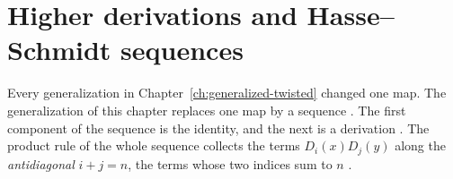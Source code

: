 \section{Higher derivations and Hasse--Schmidt sequences}\label{sec:higher-multi:hasse-schmidt}

Every generalization in Chapter~\ref{ch:generalized-twisted} changed one
map. The generalization of this chapter replaces one map by a sequence
\cite[p.~2323]{FerreroHaetinger2002}. The first component of the sequence is
the identity, and the next is a derivation
\cite[p.~2323]{FerreroHaetinger2002}. The product rule of the whole sequence
collects
the terms $D_i(x)D_j(y)$ along the \emph{antidiagonal} $i+j=n$, the terms
whose two indices sum to $n$ \cite[p.~2323]{FerreroHaetinger2002}.

